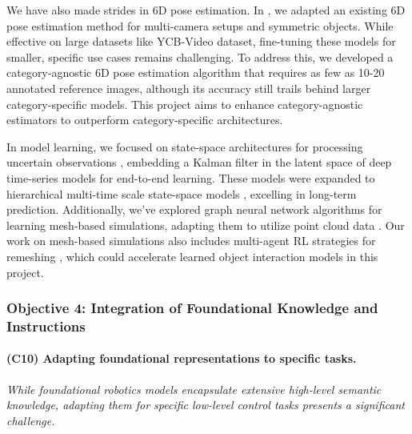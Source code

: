 \documentclass{erc-B2}
\begin{document}
We have also made strides in 6D pose estimation. In \cite{duffhauss22MV6D}, we adapted an existing 6D pose estimation method for multi-camera setups and symmetric objects. While effective on large datasets like YCB-Video dataset\cite{xiang2018posecnn}, fine-tuning these models for smaller, specific use cases remains challenging. To address this, we developed a category-agnostic 6D pose estimation algorithm \cite{gao2023sad} that requires as few as 10-20 annotated reference images, although its accuracy still trails behind larger category-specific models. This project aims to enhance category-agnostic estimators to outperform category-specific architectures.

In model learning, we focused on state-space architectures for processing uncertain observations \cite{becker19RKN,shaj2020acrkn,shaj2022hiprssm}, embedding a Kalman filter in the latent space of deep time-series models for end-to-end learning. These models were expanded to hierarchical multi-time scale state-space models \cite{shaj2023mts3}, excelling in long-term prediction. Additionally, we've explored graph neural network algorithms for learning mesh-based simulations, adapting them to utilize point cloud data \cite{linkerhagnerFSM23}. Our work on mesh-based simulations also includes multi-agent RL strategies for remeshing \cite{freymuth2023asmr}, which could accelerate learned object interaction models in this project.

\subsubsection{Objective 4: Integration of Foundational Knowledge and Instructions}

\paragraph{(C10) Adapting foundational representations to specific tasks.} 
\textit{While foundational robotics models encapsulate extensive high-level semantic knowledge, adapting them for specific low-level control tasks presents a significant challenge.}
\end{document}
